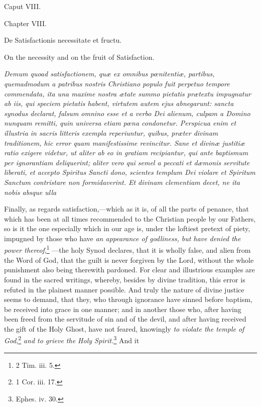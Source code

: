 Caput VIII.

Chapter VIII.

De Satisfactionis necessitate et fructu.

On the necessity and on the fruit of Satisfaction.

\emph{Demum quoad satisfactionem, quæ ex omnibus pœnitentiæ, partibus, quemadmodum a patribus nostris Christiano populo fuit perpetuo tempore commendata, ita una maxime nostra ætate summo pietatis prætextu impugnatur ab iis, qui speciem pietatis habent, virtutem autem ejus abnegarunt: sancta synodus declarat, falsum omnino esse et a verbo Dei alienum, culpam a Domino nunquam remitti, quin universa etiam pœna condonetur. Perspicua enim et illustria in sacris litteris exempla reperiuntur, quibus, præter divinam traditionem, hic error quam manifestissime revincitur. Sane et divinæ justitiæ ratio exigere videtur, ut aliter ab eo in gratiam recipiantur, qui ante baptismum per ignorantiam deliquerint; aliter vero qui semel a peccati et dæmonis servitute liberati, et accepto Spiritus Sancti dono, scientes templum Dei violare et Spiritum Sanctum contristare non formidaverint. Et divinam clementiam decet, ne ita nobis absque ulla }

Finally, as regards satisfaction,—which as it is, of all the parts of penance, that which has been at all times recommended to the Christian people by our Fathers, so is it the one especially which in our age is, under the loftiest pretext of piety, impugned by those who have \emph{an appearance of godliness, but have denied the power thereof},\footnote{\par   2 Tim. iii. 5.} —the holy Synod declares, that it is wholly false, and alien from the Word of God, that the guilt is never forgiven by the Lord, without the whole punishment also being therewith pardoned. For clear and illustrious examples are found in the sacred writings, whereby, besides by divine tradition, this error is refuted in the plainest manner possible. And truly the nature of divine justice seems to demand, that they, who through ignorance have sinned before baptism, be received into grace in one manner; and in another those who, after having been freed from the servitude of sin and of the devil, and after having received the gift of the Holy Ghost, have not feared, knowingly \emph{to violate the temple of God},\footnote{\par   1 Cor. iii. 17.} \emph{and to grieve the Holy Spirit.}\footnote{\par   Ephes. iv. 30.} And it

